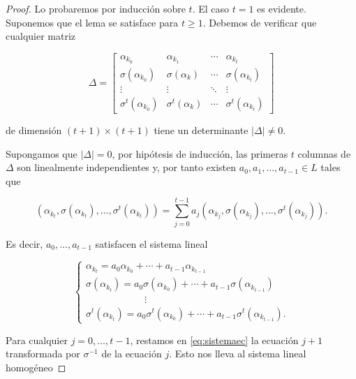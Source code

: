 \begin{proof}
Lo probaremos por inducción sobre $t$. El caso $t = 1$ es evidente. Suponemos que el lema se satisface para $t \geq 1$. Debemos de verificar que cualquier matriz 

\[ \Delta = 
\begin{bmatrix}
\alpha_{k_0} & \alpha_{k_1} & \cdots & \alpha_{k_{t}} \\
\sigma(\alpha_{k_0}) & \sigma(\alpha_{k}) & \cdots & \sigma(\alpha_{k_{t}}) \\
\vdots & \vdots & \ddots & \vdots \\
\sigma^{t}(\alpha_{k_0}) & \sigma^{t}(\alpha_{k}) & \cdots & \sigma^{t}(\alpha_{k_{t}})
\end{bmatrix}
\]

de dimensión $(t + 1) \times (t+1)$ tiene un determinante $|\Delta| \neq 0.$

Supongamos que $|\Delta| = 0$, por hipótesis de inducción, las primeras $t$ columnas de $\Delta$ son linealmente independientes y, por tanto existen $a_0,a_1,\dots,a_{t-1} \in L$ tales que

\begin{equation}
(\alpha_{k_t},\sigma(\alpha_{k_t}),\dots,\sigma^t(\alpha_{k_t})) = \sum_{j=0}^{t-1}a_j(\alpha_{k_j},\sigma(\alpha_{k_j}),\dots,\sigma^t(\alpha_{k_j})).
\end{equation}

Es decir, $a_0,\dots,a_{t-1}$ satisfacen el sistema lineal 

\begin{equation}\label{eq:sistemaec}
    \begin{cases}
    \alpha_{k_t} = a_0 \alpha_{k_0} + \cdots + a_{t-1} \alpha_{k_{t-1}} \\
    \sigma(\alpha_{k_t}) = a_0 \sigma(\alpha_{k_0}) + \cdots + a_{t-1} \sigma(\alpha_{k_{t-1}}) \\
    \qquad \qquad \qquad \vdots \\
    \sigma^t(\alpha_{k_t}) = a_0 \sigma^t(\alpha_{k_0}) + \cdots + a_{t-1} \sigma^t(\alpha_{k_{t-1}}).
    \end{cases}
\end{equation}

Para cualquier $j = 0,\dots,t-1$, restamos en \eqref{eq:sistemaec} la ecuación $j + 1$ transformada por $\sigma^{-1}$ de la ecuación $j$. Esto nos lleva al sistema lineal homogéneo


\end{proof}
